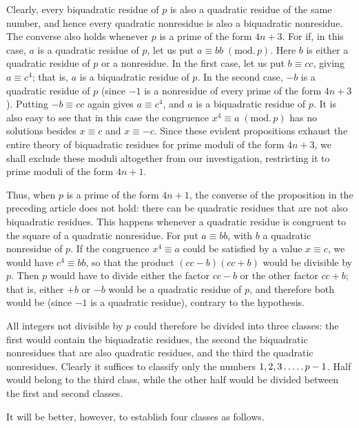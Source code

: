 Clearly, every biquadratic residue of $p$ is also a quadratic residue of the same number, and hence every quadratic nonresidue is also a biquadratic nonresidue. The converse also holds whenever $p$ is a prime of the form $4n+3$. For if, in this case, $a$ is a quadratic residue of $p$, let us put $a\equiv bb\; (\mathrm{mod.}\,p)$. Here $b$ is either a quadratic residue of $p$ or a nonresidue. In the first case, let us put $b\equiv cc$, giving $a\equiv c^4$; that is, $a$ is a biquadratic residue of $p$. In the second case, $-b$ is a quadratic residue of $p$ (since $-1$ is a nonresidue of every prime of the form $4n+3$). Putting $-b\equiv cc$ again gives $a\equiv c^4$, and $a$ is a biquadratic residue of $p$. It is also easy to see that in this case the congruence $x^4\equiv a\; (\mathrm{mod.}\,p)$ has no solutions besides $x\equiv c$ and $x\equiv-c$. Since these evident propositions exhaust the entire theory of biquadratic residues for prime moduli of the form $4n+3$, we shall exclude these moduli altogether from our investigation, restricting it to prime moduli of the form $4n+1$.

Thus, when $p$ is a prime of the form $4n+1$, the converse of the proposition in the preceding article does not hold: there can be quadratic residues that are not also biquadratic residues. This happens whenever a quadratic residue is congruent to the square of a quadratic nonresidue. For put $a\equiv bb$, with $b$ a quadratic %
nonresidue of $p$. If the congruence $x^4\equiv a$ could be satisfied by a value $x\equiv c$, we would have $c^4\equiv bb$, so that the product $(cc-b)(cc+b)$ would be divisible by $p$. Then $p$ would have to divide either the factor $cc-b$ or the other factor $cc+b$; that is, either $+b$ or $-b$ would be a quadratic residue of $p$, and therefore both would be (since $-1$ is a quadratic residue), contrary to the hypothesis.

All integers not divisible by $p$ could therefore be divided into three classes: the first would contain the biquadratic residues, the second the biquadratic nonresidues that are also quadratic residues, and the third the quadratic nonresidues. Clearly it suffices to classify only the numbers $1,2,3\mathinner{.\,.\,.\,.\,.} p-1$. Half would belong to the third class, while the other half would be divided between the first and second classes.

\newpage{}
It will be better, however, to establish four classes as follows.

